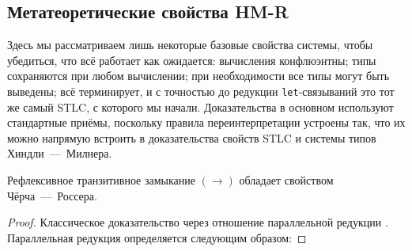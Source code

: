 \subsection{Метатеоретические свойства HM-R}
\label{HM-R-properties}

Здесь мы рассматриваем лишь некоторые базовые свойства
системы, чтобы убедиться, что всё работает как
ожидается: вычисления конфлюэнтны; типы сохраняются при
любом вычислении; при необходимости все типы могут быть
выведены; всё терминирует, и с точностью до редукции
\texttt{let}-связываний это тот же самый STLC, с
которого мы начали. Доказательства в основном
используют стандартные приёмы, поскольку правила
переинтерпретации устроены так, что их можно напрямую
встроить в доказательства свойств STLC и системы типов
Хиндли~---~Милнера.

\begin{theorem}
    Рефлексивное транзитивное замыкание $(\to)$
    обладает свойством Чёрча~---~Россера.
\end{theorem}
\begin{proof}
    Классическое доказательство через отношение
    параллельной редукции \cite{CRproof}. Параллельная
    редукция определяется следующим образом:
\end{proof}

